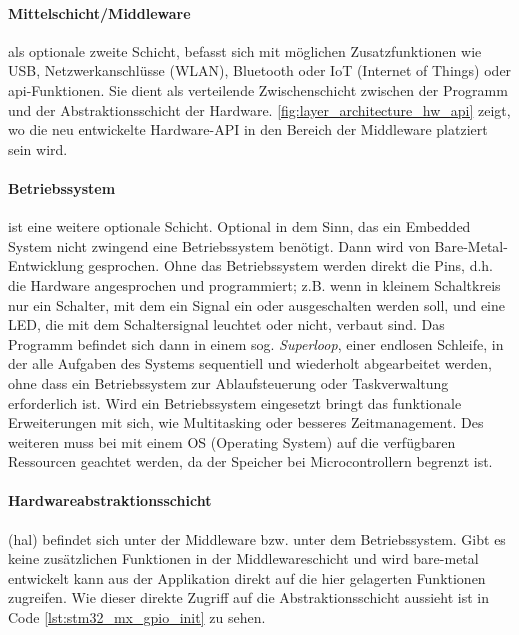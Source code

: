 \paragraph{Mittelschicht/Middleware}
als optionale zweite Schicht, befasst sich mit möglichen Zusatzfunktionen wie USB, Netzwerkanschlüsse (WLAN), Bluetooth oder IoT (Internet of Things) oder \gls{api}-Funktionen.
Sie dient als verteilende Zwischenschicht zwischen der Programm und der Abstraktionsschicht der Hardware.
\cref{fig:layer_architecture_hw_api} zeigt, wo die neu entwickelte Hardware-API in den Bereich der Middleware platziert sein wird.


\paragraph{Betriebssystem} ist eine weitere optionale Schicht.
Optional in dem Sinn, das ein Embedded System nicht zwingend eine Betriebssystem benötigt.
Dann wird von Bare-Metal-Entwicklung gesprochen.
Ohne das Betriebssystem werden direkt die Pins, d.h. die Hardware angesprochen und programmiert; z.B. wenn in kleinem Schaltkreis nur ein Schalter, mit dem ein Signal ein oder ausgeschalten werden soll, und eine LED, die mit dem Schaltersignal leuchtet oder nicht, verbaut sind.
Das Programm befindet sich dann in einem sog. \textit{Superloop}, einer endlosen Schleife, in der alle Aufgaben des Systems sequentiell und wiederholt abgearbeitet werden, ohne dass ein Betriebssystem zur Ablaufsteuerung oder Taskverwaltung erforderlich ist.
Wird ein Betriebssystem eingesetzt bringt das funktionale Erweiterungen mit sich, wie Multitasking oder besseres Zeitmanagement.
Des weiteren muss bei mit einem OS (Operating System) auf die verfügbaren Ressourcen geachtet werden, da der Speicher bei Microcontrollern begrenzt ist.

\paragraph{Hardwareabstraktionsschicht} (\gls{hal}) befindet sich unter der Middleware bzw. unter dem Betriebssystem.
Gibt es keine zusätzlichen Funktionen in der Middlewareschicht und wird bare-metal entwickelt kann aus der Applikation direkt auf die hier gelagerten Funktionen zugreifen.
Wie dieser direkte Zugriff auf die Abstraktionsschicht aussieht ist in Code \cref{lst:stm32_mx_gpio_init}
zu sehen.
\clearpage

